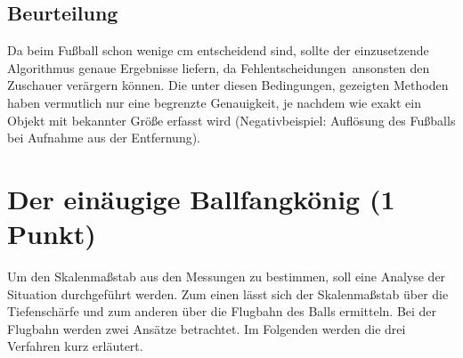 \documentclass{ezb}
\begin{document}
\subsection{Beurteilung}
Da beim Fußball schon wenige cm entscheidend sind, sollte der einzusetzende Algorithmus genaue Ergebnisse liefern, da \glqq Fehlentscheidungen\grqq \ ansonsten den Zuschauer verärgern können. Die unter diesen Bedingungen, gezeigten Methoden haben vermutlich nur eine begrenzte Genauigkeit, je nachdem wie exakt ein Objekt mit bekannter Größe erfasst wird (Negativbeispiel: Auflösung des Fußballs bei Aufnahme aus der Entfernung).
\section{Der einäugige Ballfangkönig (1 Punkt)}
Um den Skalenmaßstab aus den Messungen zu bestimmen, soll eine Analyse der Situation durchgeführt werden. Zum einen lässt sich der Skalenmaßstab über die Tiefenschärfe und zum anderen über die Flugbahn des Balls ermitteln. Bei der Flugbahn werden zwei Ansätze betrachtet. Im Folgenden werden die drei Verfahren kurz erläutert.
\end{document}
